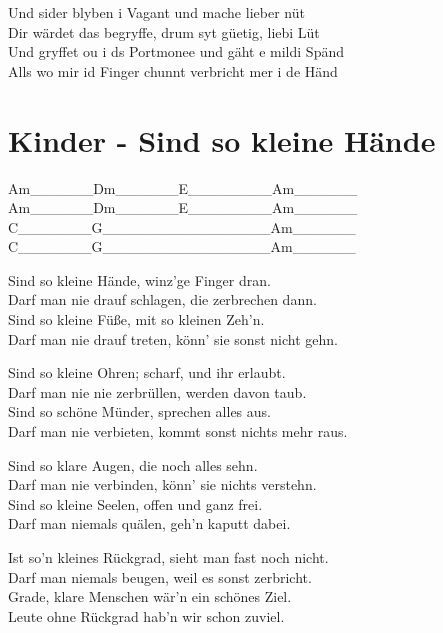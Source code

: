 \documentclass[
  letterpaper,
]{scrbook}
\begin{document}
Und sider blyben i Vagant und mache lieber nüt\\
Dir wärdet das begryffe, drum syt güetig, liebi Lüt\\
Und gryffet ou i ds Portmonee und gäht e mildi Spänd\\
Alls wo mir id Finger chunnt verbricht mer i de Händ

\hypertarget{kinder---sind-so-kleine-huxe4nde}{%
\chapter{Kinder - Sind so kleine
Hände}\label{kinder---sind-so-kleine-huxe4nde}}

Am\_\_\_\_\_\_\textbar Dm\_\_\_\_\_\_\textbar E\_\_\_\_\_\_\_\_\textbar Am\_\_\_\_\_\_\textbar{}\\
Am\_\_\_\_\_\_\textbar Dm\_\_\_\_\_\_\textbar E\_\_\_\_\_\_\_\_\textbar Am\_\_\_\_\_\_\textbar{}\\
C\_\_\_\_\_\_\_\textbar G\_\_\_\_\_\_\_\textbar\_\_\_\_\_\_\_\_\_\textbar Am\_\_\_\_\_\_\textbar{}\\
C\_\_\_\_\_\_\_\textbar G\_\_\_\_\_\_\_\textbar\_\_\_\_\_\_\_\_\_\textbar Am\_\_\_\_\_\_\textbar{}

Sind so kleine Hände, winz'ge Finger dran.\\
Darf man nie drauf schlagen, die zerbrechen dann.\\
Sind so kleine Füße, mit so kleinen Zeh'n.\\
Darf man nie drauf treten, könn' sie sonst nicht gehn.

Sind so kleine Ohren; scharf, und ihr erlaubt.\\
Darf man nie nie zerbrüllen, werden davon taub.\\
Sind so schöne Münder, sprechen alles aus.\\
Darf man nie verbieten, kommt sonst nichts mehr raus.

Sind so klare Augen, die noch alles sehn.\\
Darf man nie verbinden, könn' sie nichts verstehn.\\
Sind so kleine Seelen, offen und ganz frei.\\
Darf man niemals quälen, geh'n kaputt dabei.

Ist so'n kleines Rückgrad, sieht man fast noch nicht.\\
Darf man niemals beugen, weil es sonst zerbricht.\\
Grade, klare Menschen wär'n ein schönes Ziel.\\
Leute ohne Rückgrad hab'n wir schon zuviel.
\end{document}
